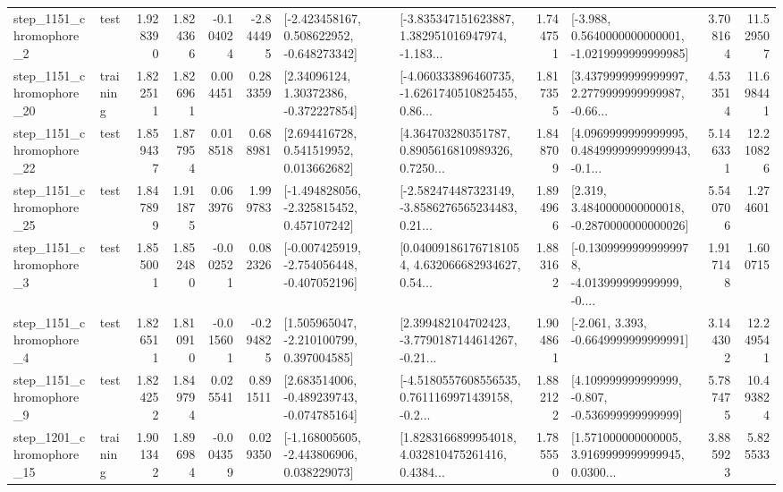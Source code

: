 \begin{tabular}{llrrrrllrlrr}
  step\_1151\_chromophore\_2 &      test &      1.928390 &    1.824366 &     -0.104024 & -2.844495 &   [-2.423458167, 0.508622952, -0.648273342] &  [-3.835347151623887, 1.382951016947974, -1.183... &       1.744751 &  [-3.988, 0.5640000000000001, -1.0219999999999985] &            3.708164 &         11.529507 \\
 step\_1151\_chromophore\_20 &  training &      1.822511 &    1.826961 &      0.004451 &  0.283359 &      [2.34096124, 1.30372386, -0.372227854] &  [-4.060333896460735, -1.6261740510825455, 0.86... &       1.817355 &  [3.4379999999999997, 2.2779999999999987, -0.66... &            4.533514 &         11.698441 \\
 step\_1151\_chromophore\_22 &      test &      1.859437 &    1.877954 &      0.018518 &  0.688981 &     [2.694416728, 0.541519952, 0.013662682] &  [4.364703280351787, 0.8905616810989326, 0.7250... &       1.848709 &  [4.0969999999999995, 0.48499999999999943, -0.1... &            5.146331 &         12.210826 \\
 step\_1151\_chromophore\_25 &      test &      1.847899 &    1.911875 &      0.063976 &  1.999783 &   [-1.494828056, -2.325815452, 0.457107242] &  [-2.582474487323149, -3.8586276565234483, 0.21... &       1.894966 &   [2.319, 3.4840000000000018, -0.2870000000000026] &            5.540706 &          1.274601 \\
  step\_1151\_chromophore\_3 &      test &      1.855001 &    1.852480 &     -0.002521 &  0.082326 &  [-0.007425919, -2.754056448, -0.407052196] &  [0.040091861767181054, 4.632066682934627, 0.54... &       1.883162 &  [-0.13099999999999978, -4.013999999999999, -0.... &            1.917148 &          1.600715 \\
  step\_1151\_chromophore\_4 &      test &      1.826511 &    1.810910 &     -0.015601 & -0.294825 &    [1.505965047, -2.210100799, 0.397004585] &  [2.399482104702423, -3.7790187144614267, -0.21... &       1.904861 &               [-2.061, 3.393, -0.6649999999999991] &            3.144302 &         12.249541 \\
  step\_1151\_chromophore\_9 &      test &      1.824252 &    1.849794 &      0.025541 &  0.891511 &   [2.683514006, -0.489239743, -0.074785164] &  [-4.5180557608556535, 0.7611169971439158, -0.2... &       1.882122 &    [4.109999999999999, -0.807, -0.536999999999999] &            5.787475 &         10.493824 \\
 step\_1201\_chromophore\_15 &  training &      1.901342 &    1.896984 &     -0.004359 &  0.029350 &   [-1.168005605, -2.443806906, 0.038229073] &  [1.8283166899954018, 4.032810475261416, 0.4384... &       1.785550 &  [1.571000000000005, 3.9169999999999945, 0.0300... &            3.885923 &          5.825533 \\

\end{tabular}
